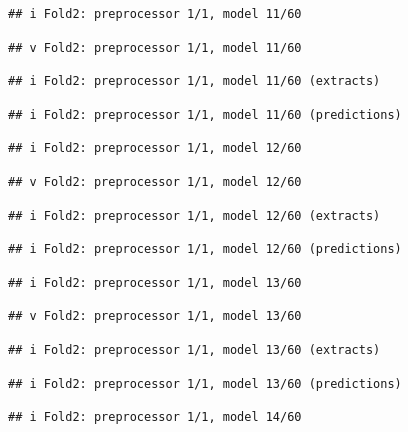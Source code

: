 \documentclass[
]{article}
\begin{document}
\begin{verbatim}
## i Fold2: preprocessor 1/1, model 11/60
\end{verbatim}

\begin{verbatim}
## v Fold2: preprocessor 1/1, model 11/60
\end{verbatim}

\begin{verbatim}
## i Fold2: preprocessor 1/1, model 11/60 (extracts)
\end{verbatim}

\begin{verbatim}
## i Fold2: preprocessor 1/1, model 11/60 (predictions)
\end{verbatim}

\begin{verbatim}
## i Fold2: preprocessor 1/1, model 12/60
\end{verbatim}

\begin{verbatim}
## v Fold2: preprocessor 1/1, model 12/60
\end{verbatim}

\begin{verbatim}
## i Fold2: preprocessor 1/1, model 12/60 (extracts)
\end{verbatim}

\begin{verbatim}
## i Fold2: preprocessor 1/1, model 12/60 (predictions)
\end{verbatim}

\begin{verbatim}
## i Fold2: preprocessor 1/1, model 13/60
\end{verbatim}

\begin{verbatim}
## v Fold2: preprocessor 1/1, model 13/60
\end{verbatim}

\begin{verbatim}
## i Fold2: preprocessor 1/1, model 13/60 (extracts)
\end{verbatim}

\begin{verbatim}
## i Fold2: preprocessor 1/1, model 13/60 (predictions)
\end{verbatim}

\begin{verbatim}
## i Fold2: preprocessor 1/1, model 14/60
\end{verbatim}
\end{document}
